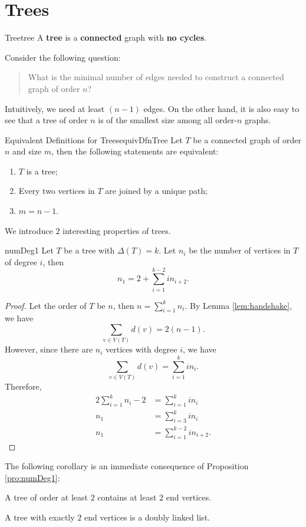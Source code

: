 \documentclass[math]{amznotes}
\theoremstyle{remark}
\begin{document}
\section{Trees}
\begin{dfnbox}{Tree}{tree}
    A {\color{red} \textbf{tree}} is a {\color{red} \textbf{connected}} graph with {\color{red} \textbf{no cycles}}.
\end{dfnbox}
Consider the following question:
\begin{quote}
    What is the minimal number of edges needed to construct a connected graph of order $n$?
\end{quote}
Intuitively, we need at least $(n - 1)$ edges. On the other hand, it is also easy to see that a tree of order $n$ is of the smallest size among all order-$n$ graphs.
\begin{thmbox}{Equivalent Definitions for Trees}{equivDfnTree}
    Let $T$ be a connected graph of order $n$ and size $m$, then the following statements are equivalent:
    \begin{enumerate}
        \item $T$ is a tree;
        \item Every two vertices in $T$ are joined by a unique path;
        \item $m = n - 1$.
    \end{enumerate}
\end{thmbox}
We introduce $2$ interesting properties of trees.
\begin{probox}{}{numDeg1}
    Let $T$ be a tree with $\Delta(T) = k$. Let $n_i$ be the number of vertices in $T$ of degree $i$, then
    \begin{equation*}
        n_1 = 2 + \sum_{i = 1}^{k - 2}in_{i + 2}.
    \end{equation*}
    \tcblower
    \begin{proof}
        Let the order of $T$ be $n$, then $n = \sum_{i = 1}^{k}n_i$. By Lemma \ref{lem:handshake}, we have
        \begin{equation*}
            \sum_{v \in V(T)}d(v) = 2(n - 1).
        \end{equation*}
        However, since there are $n_i$ vertices with degree $i$, we have
        \begin{equation*}
            \sum_{v \in V(T)}d(v) = \sum_{i = 1}^{k}in_i.
        \end{equation*}
        Therefore,
        \begin{align*}
            2\sum_{i = 1}^{k}n_i - 2 & = \sum_{i = 1}^{k}in_i \\
            n_1 & = \sum_{i = 3}^{k}in_i \\
            n_1 & = \sum_{i = 1}^{k - 2}in_{i + 2}.
        \end{align*}
    \end{proof}
\end{probox}
The following corollary is an immediate consequence of Proposition \ref{pro:numDeg1}:
\begin{corbox}{}{}
    A tree of order at least $2$ contains at least $2$ end vertices.
\end{corbox}
A tree with exactly $2$ end vertices is a doubly linked list.
\end{document}
